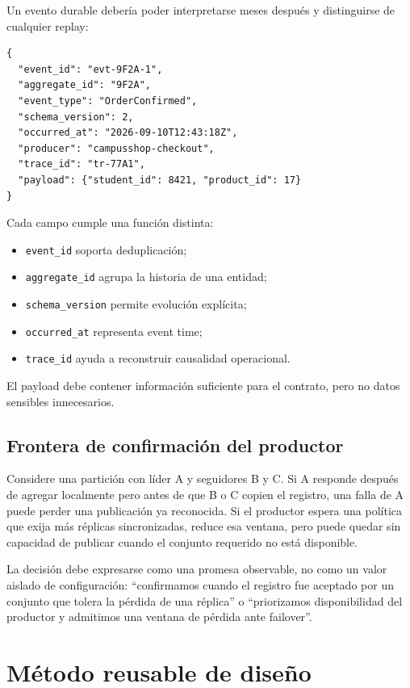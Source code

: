 \documentclass[variant=apuntes,cover=institutional,mode=screen]{ua-engineering-v6-article}
\begin{document}
Un evento durable debería poder interpretarse meses después y distinguirse de cualquier replay:

\begin{verbatim}
{
  "event_id": "evt-9F2A-1",
  "aggregate_id": "9F2A",
  "event_type": "OrderConfirmed",
  "schema_version": 2,
  "occurred_at": "2026-09-10T12:43:18Z",
  "producer": "campusshop-checkout",
  "trace_id": "tr-77A1",
  "payload": {"student_id": 8421, "product_id": 17}
}
\end{verbatim}

Cada campo cumple una función distinta:
\begin{itemize}
\item \texttt{event\_id} soporta deduplicación;
\item \texttt{aggregate\_id} agrupa la historia de una entidad;
\item \texttt{schema\_version} permite evolución explícita;
\item \texttt{occurred\_at} representa event time;
\item \texttt{trace\_id} ayuda a reconstruir causalidad operacional.
\end{itemize}
El payload debe contener información suficiente para el contrato, pero no datos sensibles innecesarios.

\subsection{Frontera de confirmación del productor}

Considere una partición con líder A y seguidores B y C. Si A responde después de agregar localmente pero antes de que B o C copien el registro, una falla de A puede perder una publicación ya reconocida. Si el productor espera una política que exija más réplicas sincronizadas, reduce esa ventana, pero puede quedar sin capacidad de publicar cuando el conjunto requerido no está disponible.

La decisión debe expresarse como una promesa observable, no como un valor aislado de configuración: ``confirmamos cuando el registro fue aceptado por un conjunto que tolera la pérdida de una réplica'' o ``priorizamos disponibilidad del productor y admitimos una ventana de pérdida ante failover''.

\section{Método reusable de diseño}
\end{document}
